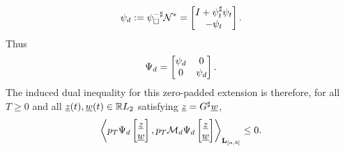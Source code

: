 \begin{example}
    \begin{equation}
        \psi_d
        :=
        \psi_\square^{-\sharp}\mathcal{N}^*
        =
        \begin{bmatrix}I+\psi_t^\sharp\psi_t\\-\psi_t\end{bmatrix}.
    \end{equation}
    Thus
    \begin{equation}
        \Psi_d = \begin{bmatrix}\psi_d & 0\\0 & \psi_d\end{bmatrix}
        .
    \end{equation}
    The induced dual inequality for this zero-padded extension is
    therefore, for all $T\geq0$ and all $\underline{z}(t),\underline{w}(t)\in\mathbb{R} L_2$
    satisfying $\underline{z}=G^\sharp\underline{w}$,
    \begin{equation}
        \left\langle 
            p_T
            \Psi_d
            \begin{bmatrix}\underline{z}\\\underline{w}\end{bmatrix}
        , 
            p_T\mathcal{M}_d
            \Psi_d
            \begin{bmatrix}\underline{z}\\\underline{w}\end{bmatrix}
         \right\rangle_{\mathbf{L}_{[a,b]}}
        \leq0.
    \end{equation}
\end{example}